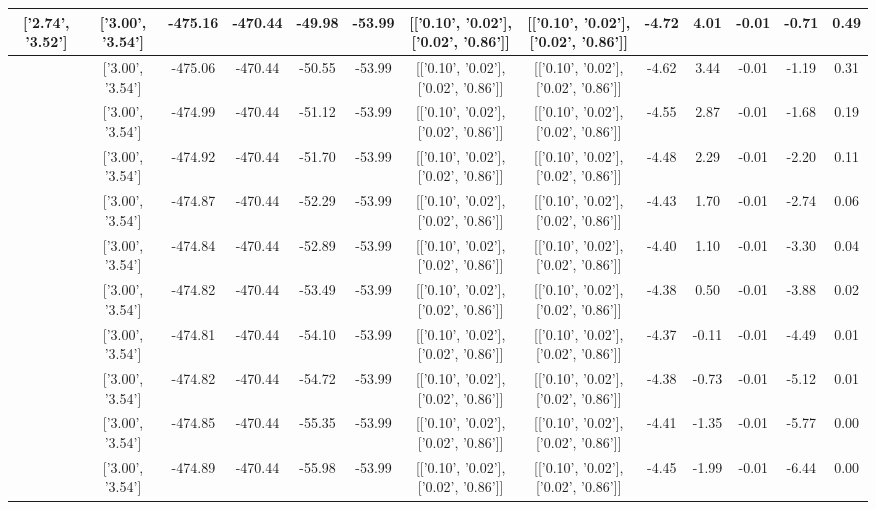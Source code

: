 \begin{table}[htbp]
\begin{adjustbox}{angle=90}
\begin{tabular}{|c|c|c|c|c|c|c|c|c|c|c|c|c|}
 ['2.74', '3.52'] & ['3.00', '3.54'] & -475.16 & -470.44 & -49.98 & -53.99 & [['0.10', '0.02'], ['0.02', '0.86']] & [['0.10', '0.02'], ['0.02', '0.86']] & -4.72 & 4.01 & -0.01 & -0.71 & 0.49\\ \hline
 ['2.78', '3.53'] & ['3.00', '3.54'] & -475.06 & -470.44 & -50.55 & -53.99 & [['0.10', '0.02'], ['0.02', '0.86']] & [['0.10', '0.02'], ['0.02', '0.86']] & -4.62 & 3.44 & -0.01 & -1.19 & 0.31\\ \hline
 ['2.81', '3.53'] & ['3.00', '3.54'] & -474.99 & -470.44 & -51.12 & -53.99 & [['0.10', '0.02'], ['0.02', '0.86']] & [['0.10', '0.02'], ['0.02', '0.86']] & -4.55 & 2.87 & -0.01 & -1.68 & 0.19\\ \hline
 ['2.85', '3.53'] & ['3.00', '3.54'] & -474.92 & -470.44 & -51.70 & -53.99 & [['0.10', '0.02'], ['0.02', '0.86']] & [['0.10', '0.02'], ['0.02', '0.86']] & -4.48 & 2.29 & -0.01 & -2.20 & 0.11\\ \hline
 ['2.89', '3.53'] & ['3.00', '3.54'] & -474.87 & -470.44 & -52.29 & -53.99 & [['0.10', '0.02'], ['0.02', '0.86']] & [['0.10', '0.02'], ['0.02', '0.86']] & -4.43 & 1.70 & -0.01 & -2.74 & 0.06\\ \hline
 ['2.93', '3.54'] & ['3.00', '3.54'] & -474.84 & -470.44 & -52.89 & -53.99 & [['0.10', '0.02'], ['0.02', '0.86']] & [['0.10', '0.02'], ['0.02', '0.86']] & -4.40 & 1.10 & -0.01 & -3.30 & 0.04\\ \hline
 ['2.96', '3.54'] & ['3.00', '3.54'] & -474.82 & -470.44 & -53.49 & -53.99 & [['0.10', '0.02'], ['0.02', '0.86']] & [['0.10', '0.02'], ['0.02', '0.86']] & -4.38 & 0.50 & -0.01 & -3.88 & 0.02\\ \hline
 ['3.00', '3.54'] & ['3.00', '3.54'] & -474.81 & -470.44 & -54.10 & -53.99 & [['0.10', '0.02'], ['0.02', '0.86']] & [['0.10', '0.02'], ['0.02', '0.86']] & -4.37 & -0.11 & -0.01 & -4.49 & 0.01\\ \hline
 ['3.04', '3.54'] & ['3.00', '3.54'] & -474.82 & -470.44 & -54.72 & -53.99 & [['0.10', '0.02'], ['0.02', '0.86']] & [['0.10', '0.02'], ['0.02', '0.86']] & -4.38 & -0.73 & -0.01 & -5.12 & 0.01\\ \hline
 ['3.08', '3.55'] & ['3.00', '3.54'] & -474.85 & -470.44 & -55.35 & -53.99 & [['0.10', '0.02'], ['0.02', '0.86']] & [['0.10', '0.02'], ['0.02', '0.86']] & -4.41 & -1.35 & -0.01 & -5.77 & 0.00\\ \hline
 ['3.12', '3.55'] & ['3.00', '3.54'] & -474.89 & -470.44 & -55.98 & -53.99 & [['0.10', '0.02'], ['0.02', '0.86']] & [['0.10', '0.02'], ['0.02', '0.86']] & -4.45 & -1.99 & -0.01 & -6.44 & 0.00\\ \hline

\end{tabular}
\end{adjustbox}
\end{table}
